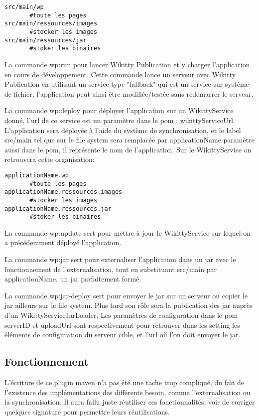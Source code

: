 \begin{verbatim}
src/main/wp
       #toute les pages
src/main/ressources/images
       #stocker les images
src/main/ressources/jar
       #stoker les binaires
\end{verbatim}

La commande wp:run pour lancer Wikitty Publication et y charger l'application
en cours de développement. Cette commande lance un serveur avec Wikitty Publication
en utilisant un service type "fallback" qui est un service sur système de fichier,
l'application peut ainsi être modifiée/testée sans redémarrer le serveur. 

La commande wp:deploy pour déployer l'application sur un WikittyService donné,
l'url de ce service est un paramètre dans le pom : wikittyServiceUrl. 
L'application sera déployée à l'aide du système de synchronisation, et le label
src/main tel que sur le file system sera remplacée par applicationName paramètre
aussi dans le pom, il représente le nom de l'application. Sur le WikittyService
on retrouvera cette organisation:
\begin{verbatim}
applicationName.wp
       #toute les pages
applicationName.ressources.images
       #stocker les images
applicationName.ressources.jar
       #stoker les binaires
\end{verbatim}


La commande wp:update sert pour mettre à jour le WikittyService sur lequel
on a précédemment déployé l'application.

La commande wp:jar sert pour externaliser l'application dans un jar avec le
fonctionnement de l'externalisation, tout en substituant src/main par applicationName,
un jar parfaitement formé.

La commande wp:jar-deploy sert pour envoyer le jar sur un serveur ou copier
le jar ailleurs sur le file system. Plus tard son rôle sera la publication 
des jar auprès d'un WikittyServiceJarLoader. Les paramètres de configuration dans
le pom serverID et uploadUrl sont respectivement pour retrouver dans les 
setting les éléments de configuration du serveur cible, et l'url où l'on 
doit envoyer le jar.


\subsection{Fonctionnement}

L'écriture de ce plugin maven n'a pas été une tache trop compliqué, du fait de 
l'existence des implémentations des différents besoin, comme l'externalisation
ou la synchronisation. Il aura fallu juste réutiliser ces fonctionnalités, voir
de corriger quelques signature pour permettre leurs réutilisations.

